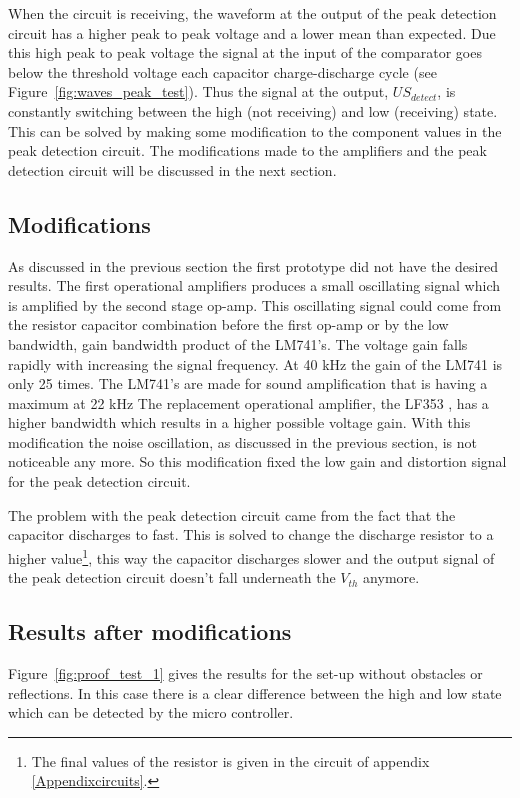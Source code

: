 When the circuit is receiving, the waveform at the output of the peak detection circuit has a higher peak to peak voltage and a lower mean than expected.
Due this high peak to peak voltage the signal at the input of the comparator goes below the threshold voltage each capacitor charge-discharge cycle (see Figure~\ref{fig:waves_peak_test}).
Thus the signal at the output, $US_{detect}$, is constantly switching between the high (not receiving) and low (receiving) state.
This can be solved by making some modification to the component values in the peak detection circuit.
The modifications made to the amplifiers and the peak detection circuit will be discussed in the next section.


\subsection{Modifications}
\label{chap:mod}
As discussed in the previous section the first prototype did not have the desired results. The first operational amplifiers produces a small oscillating signal which is amplified by the second stage op-amp. This oscillating signal could come from the resistor capacitor combination before the first op-amp or by the low bandwidth, gain bandwidth product of the LM741's. The voltage gain falls rapidly with increasing the signal frequency. At 40 kHz the gain of the LM741 is only 25 times. The LM741's are made for sound amplification that is having a maximum at 22 kHz The replacement operational amplifier, the LF353 \cite{LF353}, has a higher bandwidth which results in a higher possible voltage gain. With this modification the noise oscillation, as discussed in the previous section, is not noticeable any more. So this modification fixed the low gain and distortion signal for the peak detection circuit.

The problem with the peak detection circuit came from the fact that the capacitor discharges to fast. This is solved to change the discharge resistor to a higher value\footnote{The final values of the resistor is given in the circuit of appendix \ref{Appendixcircuits}.}, this way the capacitor discharges slower and the output signal of the peak detection circuit doesn't fall underneath the $V_{th}$ anymore.


\subsection{Results after modifications}

Figure~\ref{fig:proof_test_1} gives the results for the set-up without obstacles or reflections.
In this case there is a clear difference between the high and low state which can be detected by the micro controller.


